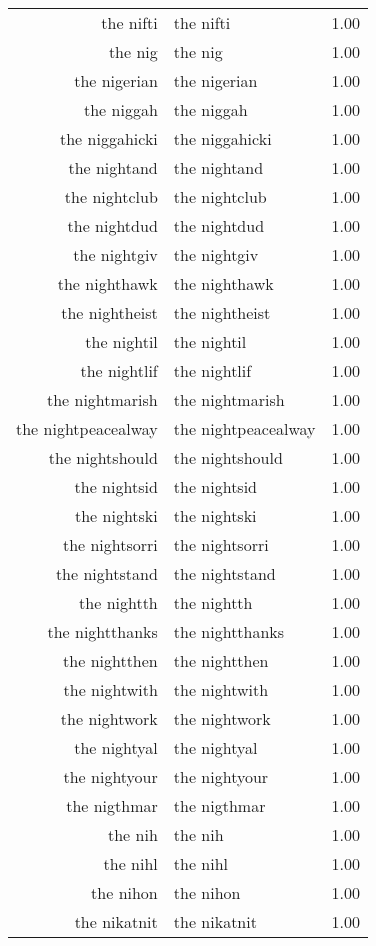 \begin{table}[ht]
\begin{tabular}{rlr}
  the nifti & the nifti & 1.00 \\ 
  the nig & the nig & 1.00 \\ 
  the nigerian & the nigerian & 1.00 \\ 
  the niggah & the niggah & 1.00 \\ 
  the niggahicki & the niggahicki & 1.00 \\ 
  the nightand & the nightand & 1.00 \\ 
  the nightclub & the nightclub & 1.00 \\ 
  the nightdud & the nightdud & 1.00 \\ 
  the nightgiv & the nightgiv & 1.00 \\ 
  the nighthawk & the nighthawk & 1.00 \\ 
  the nightheist & the nightheist & 1.00 \\ 
  the nightil & the nightil & 1.00 \\ 
  the nightlif & the nightlif & 1.00 \\ 
  the nightmarish & the nightmarish & 1.00 \\ 
  the nightpeacealway & the nightpeacealway & 1.00 \\ 
  the nightshould & the nightshould & 1.00 \\ 
  the nightsid & the nightsid & 1.00 \\ 
  the nightski & the nightski & 1.00 \\ 
  the nightsorri & the nightsorri & 1.00 \\ 
  the nightstand & the nightstand & 1.00 \\ 
  the nightth & the nightth & 1.00 \\ 
  the nightthanks & the nightthanks & 1.00 \\ 
  the nightthen & the nightthen & 1.00 \\ 
  the nightwith & the nightwith & 1.00 \\ 
  the nightwork & the nightwork & 1.00 \\ 
  the nightyal & the nightyal & 1.00 \\ 
  the nightyour & the nightyour & 1.00 \\ 
  the nigthmar & the nigthmar & 1.00 \\ 
  the nih & the nih & 1.00 \\ 
  the nihl & the nihl & 1.00 \\ 
  the nihon & the nihon & 1.00 \\ 
  the nikatnit & the nikatnit & 1.00 \\ 

\end{tabular}
\end{table}
